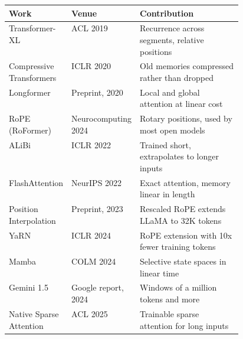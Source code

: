 \begin{center}\footnotesize
\begin{tabularx}{\linewidth}{L{0.26\linewidth}L{0.2\linewidth}X}
\toprule
\textbf{Work} & \textbf{Venue} & \textbf{Contribution} \\
\midrule
Transformer-XL & ACL 2019 & Recurrence across segments, relative positions \\
Compressive Transformers & ICLR 2020 & Old memories compressed rather than dropped \\
Longformer & Preprint, 2020 & Local and global attention at linear cost \\
RoPE (RoFormer) & Neurocomputing 2024 & Rotary positions, used by most open models \\
ALiBi & ICLR 2022 & Trained short, extrapolates to longer inputs \\
FlashAttention & NeurIPS 2022 & Exact attention, memory linear in length \\
Position Interpolation & Preprint, 2023 & Rescaled RoPE extends LLaMA to 32K tokens \\
YaRN & ICLR 2024 & RoPE extension with 10x fewer training tokens \\
Mamba & COLM 2024 & Selective state spaces in linear time \\
Gemini 1.5 & Google report, 2024 & Windows of a million tokens and more \\
Native Sparse Attention & ACL 2025 & Trainable sparse attention for long inputs \\
\bottomrule
\end{tabularx}
\end{center}

